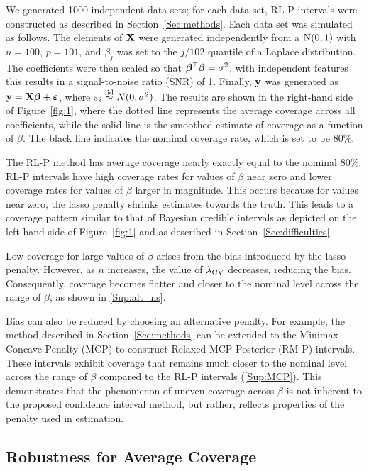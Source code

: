 We generated 1000 independent data sets; for each data set, RL-P intervals were constructed as described in Section~\ref{Sec:methods}. Each data set was simulated as follows. The elements of $\mathbf{X}$ were generated independently from a $\textrm{N}(0, 1)$ with $n = 100$, $p = 101$, and $\beta_j$ was set to the $j/102$ quantile of a Laplace distribution. The coefficients were then scaled so that $\boldsymbol{\beta} ^{\scriptscriptstyle\top}\boldsymbol{\beta} = \sigma^2$, with independent features this results in a signal-to-noise ratio (SNR) of 1. Finally, $\mathbf{y}$ was generated as $\mathbf{y} = \mathbf{X}\boldsymbol{\beta} + \boldsymbol{\varepsilon}$, where $\varepsilon_i \overset{\text{iid}}{\sim} N(0, \sigma^2)$. The results are shown in the right-hand side of Figure~\ref{fig:1}, where the dotted line represents the average coverage across all coefficients, while the solid line is the smoothed estimate of coverage as a function of $\beta$. The black line indicates the nominal coverage rate, which is set to be 80\%.

The RL-P method has average coverage nearly exactly equal to the nominal 80\%. RL-P intervals have high coverage rates for values of $\beta$ near zero and lower coverage rates for values of $\beta$ larger in magnitude. This occurs because for values near zero, the lasso penalty shrinks estimates towards the truth. This leads to a coverage pattern similar to that of Bayesian credible intervals as depicted on the left hand side of Figure~\ref{fig:1} and as described in Section~\ref{Sec:difficulties}.

Low coverage for large values of $\beta$ arises from the bias introduced by the lasso penalty. However, as $n$ increases, the value of $\lambda_{\textrm{CV}}$ decreases, reducing the bias. Consequently, coverage becomes flatter and closer to the nominal level across the range of $\beta$, as shown in \ref{Sup:alt_ns}.

Bias can also be reduced by choosing an alternative penalty. For example, the method described in Section~\ref{Sec:methods} can be extended to the Minimax Concave Penalty (MCP) to construct Relaxed MCP Posterior (RM-P) intervals. These intervals exhibit coverage that remains much closer to the nominal level across the range of $\beta$ compared to the RL-P intervals (\ref{Sup:MCP}). This demonstrates that the phenomenon of uneven coverage across $\beta$ is not inherent to the proposed confidence interval method, but rather, reflects properties of the penalty used in estimation.

\subsection{Robustness for Average Coverage}
\label{Sec:robustness}

